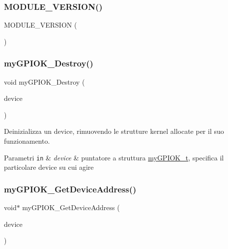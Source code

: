 \subsubsection{\texorpdfstring{M\+O\+D\+U\+L\+E\+\_\+\+V\+E\+R\+S\+I\+O\+N()}{MODULE\_VERSION()}}
{\footnotesize\ttfamily M\+O\+D\+U\+L\+E\+\_\+\+V\+E\+R\+S\+I\+ON (\begin{DoxyParamCaption}\item[{\char`\"{}3.\+2\char`\"{}}]{ }\end{DoxyParamCaption})}

\mbox{\label{group___linux-_driver_ga24255b79dd8549aa655cf28c1f9a65d5}} 
\subsubsection{\texorpdfstring{my\+G\+P\+I\+O\+K\+\_\+\+Destroy()}{myGPIOK\_Destroy()}}
{\footnotesize\ttfamily void my\+G\+P\+I\+O\+K\+\_\+\+Destroy (\begin{DoxyParamCaption}\item[{\hyperlink{structmy_g_p_i_o_k__t}{my\+G\+P\+I\+O\+K\+\_\+t} $\ast$}]{device }\end{DoxyParamCaption})}



Deinizializza un device, rimuovendo le strutture kernel allocate per il suo funzionamento. 


\begin{DoxyParams}[1]{Parametri}
\mbox{\tt in}  & {\em device} & puntatore a struttura \hyperlink{structmy_g_p_i_o_k__t}{my\+G\+P\+I\+O\+K\+\_\+t}, specifica il particolare device su cui agire \\
\hline
\end{DoxyParams}
\mbox{\label{group___linux-_driver_ga565ffd4946b330b29e1166dfc9851b11}} 
\subsubsection{\texorpdfstring{my\+G\+P\+I\+O\+K\+\_\+\+Get\+Device\+Address()}{myGPIOK\_GetDeviceAddress()}}
{\footnotesize\ttfamily void$\ast$ my\+G\+P\+I\+O\+K\+\_\+\+Get\+Device\+Address (\begin{DoxyParamCaption}\item[{\hyperlink{structmy_g_p_i_o_k__t}{my\+G\+P\+I\+O\+K\+\_\+t} $\ast$}]{device }\end{DoxyParamCaption})}



